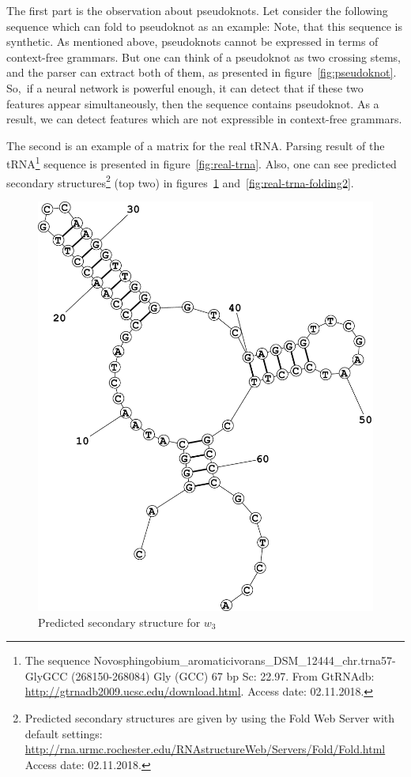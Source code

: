 \documentclass[a4paper,twoside]{article}
\begin{document}
The first part is the observation about pseudoknots. 
Let consider the following sequence which can fold to pseudoknot as an example: {}
Note, that this sequence is synthetic.
As mentioned above, pseudoknots cannot be expressed in terms of context-free grammars. 
But one can think of a pseudoknot as two crossing stems, and the parser can extract both of them, as presented in figure~\ref{fig:pseudoknot}.
So,~if a neural network is powerful enough, it can detect that if these two features appear simultaneously, then the sequence contains pseudoknot.
As a result, we can detect features which are not expressible in context-free grammars.

The second is an example of a matrix for the real tRNA.
Parsing result of the tRNA\footnote{The sequence Novosphingobium\_aromaticivorans\_DSM\_12444\_chr.trna57-GlyGCC (268150-268084)  Gly (GCC) 67 bp Sc: 22.97. From GtRNAdb: \url{http://gtrnadb2009.ucsc.edu/download.html}. Access date: 02.11.2018.} sequence {} is presented in figure~\ref{fig:real-trna}. Also, one can see predicted secondary structures\footnote{Predicted secondary structures are given by using the Fold Web Server with default settings: \url{http://rna.urmc.rochester.edu/RNAstructureWeb/Servers/Fold/Fold.html} Access date: 02.11.2018.} (top two) in figures~\ref{fig:real-trna-folding1} and~\ref{fig:real-trna-folding2}.

\begin{figure}
\centering
\includegraphics[width=.45\textwidth]{figures/Fold1.pdf}
\caption{Predicted secondary structure for $w_3$}
\label{fig:real-trna-folding1}
\end{figure}
\end{document}
